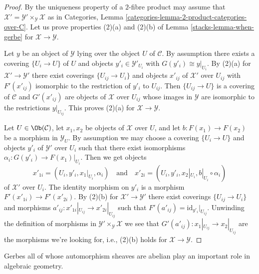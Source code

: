\begin{proof}

By the uniqueness property of a $2$-fibre product may assume that
$\mathcal{X}' = \mathcal{Y}' \times_\mathcal{Y} \mathcal{X}$
as in
Categories, Lemma \ref{categories-lemma-2-product-categories-over-C}.
Let us prove properties (2)(a) and (2)(b) of
Lemma \ref{stacks-lemma-when-gerbe}
for $\mathcal{X} \to \mathcal{Y}$.

\medskip\noindent
Let $y$ be an object of $\mathcal{Y}$ lying over the object $U$
of $\mathcal{C}$. By assumption there exists
a covering $\{U_i \to U\}$ of $U$ and objects
$y'_i \in \mathcal{Y}'_{U_i}$ with $G(y'_i) \cong y|_{U_i}$.
By (2)(a) for $\mathcal{X}' \to \mathcal{Y}'$ there exist
coverings $\{U_{ij} \to U_i\}$ and objects $x'_{ij}$ of
$\mathcal{X}'$ over $U_{ij}$ with $F'(x'_{ij})$ isomorphic
to the restriction of $y'_i$ to $U_{ij}$. Then
$\{U_{ij} \to U\}$ is a covering of $\mathcal{C}$ and
$G'(x'_{ij})$ are objects of $\mathcal{X}$ over $U_{ij}$
whose images in $\mathcal{Y}$ are isomorphic to the restrictions
$y|_{U_{ij}}$. This proves (2)(a) for $\mathcal{X} \to \mathcal{Y}$.

\medskip\noindent
Let $U \in \Ob(\mathcal{C})$, let $x_1, x_2$ be objects of
$\mathcal{X}$ over $U$, and let $b : F(x_1) \to F(x_2)$ be a morphism
in $\mathcal{Y}_U$. By assumption we may choose a covering
$\{U_i \to U\}$ and objects $y'_i$ of $\mathcal{Y}'$
over $U_i$ such that there exist isomorphisms
$\alpha_i : G(y'_i) \to F(x_1)|_{U_i}$.
Then we get objects
$$
x'_{1i} = (U_i, y'_i, x_1|_{U_i}, \alpha_i)
\quad\text{and}\quad
x'_{2i} = (U_i, y'_i, x_2|_{U_i}, b|_{U_i} \circ \alpha_i)
$$
of $\mathcal{X}'$ over $U_i$. The identity morphism on $y'_i$ is a
morphism $F'(x'_{1i}) \to F'(x'_{2i})$. By (2)(b) for
$\mathcal{X}' \to \mathcal{Y}'$ there exist coverings
$\{U_{ij} \to U_i\}$ and morphisms
$a'_{ij} : x'_{1i}|_{U_{ij}} \to x'_{2i}|_{U_{ij}}$
such that $F'(a'_{ij}) = \text{id}_{y'_i}|_{U_{ij}}$. Unwinding the definition
of morphisms in $\mathcal{Y}' \times_\mathcal{Y} \mathcal{X}$
we see that $G'(a'_{ij}) : x_1|_{U_{ij}} \to x_2|_{U_{ij}}$ are
the morphisms we're looking for, i.e., (2)(b) holds for
$\mathcal{X} \to \mathcal{Y}$.
\end{proof}

Gerbes all of whose automorphism sheaves are abelian play an important
role in algebraic geometry.

